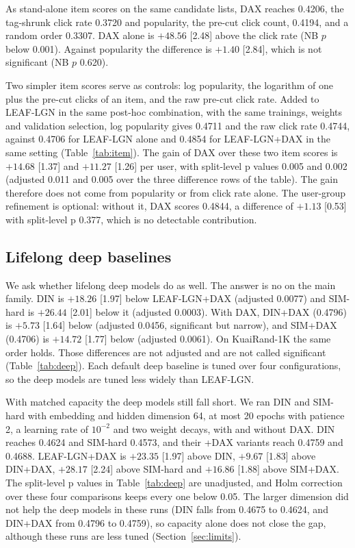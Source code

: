 As stand-alone item scores on the same candidate lists, DAX reaches 0.4206, the tag-shrunk click rate 0.3720 and popularity, the pre-cut click
count, 0.4194, and a random order 0.3307. DAX alone is $+48.56$ [2.48] above the click rate (NB $p$ below 0.001). Against popularity the difference is $+1.40$ [2.84],
which is not significant (NB $p$ 0.620).



Two simpler item scores serve as controls: log popularity, the logarithm of one plus the pre-cut clicks of an item, and the raw
pre-cut click rate. Added to LEAF-LGN in the same post-hoc combination, with the same trainings, weights and validation selection,
log popularity gives 0.4711 and the raw click rate 0.4744, against 0.4706 for LEAF-LGN alone and 0.4854 for LEAF-LGN+DAX in the same
setting (Table~\ref{tab:item}). The gain of DAX over these two item scores is $+14.68$ [1.37] and $+11.27$ [1.26] per user, with
split-level p values 0.005 and 0.002 (adjusted 0.011 and 0.005 over the three difference rows of the table). The gain therefore does
not come from popularity or from click rate alone. The user-group refinement is optional: without it, DAX scores 0.4844, a difference
of $+1.13$ [0.53] with split-level p 0.377, which is no detectable contribution.



\subsection{Lifelong deep baselines}
\label{sec:res-deep}

We ask whether lifelong deep models do as well. The answer is no on the main family. DIN is $+18.26$ [1.97] below LEAF-LGN+DAX (adjusted 0.0077) and SIM-hard is
$+26.44$ [2.01] below it (adjusted 0.0003). With DAX, DIN+DAX (0.4796) is $+5.73$ [1.64] below (adjusted 0.0456, significant but narrow), and SIM+DAX (0.4706)
is $+14.72$ [1.77] below (adjusted 0.0061). On KuaiRand-1K the same order holds. Those differences are not adjusted and are not called significant
(Table~\ref{tab:deep}). Each default deep baseline is tuned over four configurations, so the deep models are tuned less widely than LEAF-LGN.

With matched capacity the deep models still fall short. We ran DIN and SIM-hard with embedding and hidden dimension 64, at most 20 epochs
with patience 2, a learning rate of $10^{-2}$ and two weight decays, with and without DAX. DIN reaches 0.4624 and SIM-hard 0.4573, and their
+DAX variants reach 0.4759 and 0.4688. LEAF-LGN+DAX is $+23.35$ [1.97] above DIN, $+9.67$ [1.83] above DIN+DAX, $+28.17$ [2.24] above SIM-hard
and $+16.86$ [1.88] above SIM+DAX. The split-level p values in Table~\ref{tab:deep} are unadjusted, and Holm correction over these four
comparisons keeps every one below 0.05. The larger dimension did not help the deep models in these runs (DIN falls from 0.4675 to 0.4624, and DIN+DAX from 0.4796 to 0.4759), so capacity alone does not close the gap, although these runs are less tuned (Section~\ref{sec:limits}).

